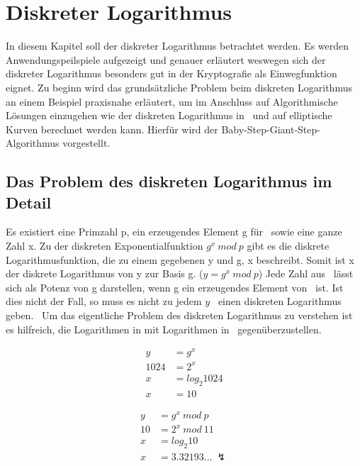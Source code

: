 \section{Diskreter Logarithmus}
	In diesem Kapitel soll der diskreter Logarithmus betrachtet werden. Es werden Anwendungspeilspiele aufgezeigt und genauer erläutert weswegen sich der diskreter Logarithmus besonders gut in der Kryptografie als Einwegfunktion eignet. Zu beginn wird das grundsätzliche Problem beim diskreten Logarithmus an einem Beispiel praxisnahe erläutert, um im Anschluss auf Algorithmische Lösungen einzugehen wie der diskreten Logarithmus in \myZPStern~und auf elliptische Kurven berechnet werden kann. Hierfür wird der Baby-Step-Giant-Step-Algorithmus vorgestellt.

	\subsection{Das Problem des diskreten Logarithmus im Detail}
		Es existiert eine Primzahl p, ein erzeugendes Element g für \myZPStern~sowie eine ganze Zahl x. Zu der diskreten Exponentialfunktion $g^x~mod~p$ gibt es die diskrete Logarithmusfunktion, die zu einem gegebenen y und g, x beschreibt. Somit ist x der diskrete Logarithmus von y zur Basis g. ($y = g^x~mod~p$) Jede Zahl aus \myZPStern~lässt sich als Potenz von g darstellen, wenn g ein erzeugendes Element von \myZPStern~ist. Ist dies nicht der Fall, so muss es nicht zu jedem $y$ \myin \myZPStern~einen diskreten Logarithmus geben.~\cite{Kryptografie:in:Theorie:und:Praxis} Um das eigentliche Problem des diskreten Logarithmus zu verstehen ist es hilfreich, die Logarithmen in  mit Logarithmen in \myZPStern~gegenüberzustellen.
		\begin{minipage}{0.24\textwidth}
			\begin{equation}
			\begin{aligned}
			y &= g^x\\
			1024 &= 2^x\\
			x &= log_2 1024\\
			x &= 10
			\end{aligned}
			\label{Gleichung Log in Z}
			\end{equation}
		\end{minipage}
		\begin{minipage}{0.24\textwidth}
			\begin{equation}
			\begin{aligned}
			y &= g^x~mod~p\\
			10 &= 2^x~mod~11\\
			x &= log_2 10\\
			x &= 3.32193...~\lightning
			\end{aligned}
			\label{Gleichung Log in ZP}
			\end{equation}
		\end{minipage}

